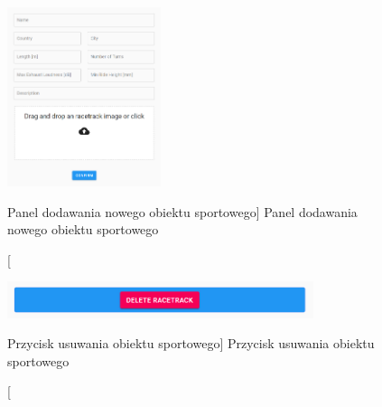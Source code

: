 \documentclass[../Kamil_Kowalewski_Main.tex]{subfiles}
\begin{document}
{{{            \begin{figure}[H]
                \centering
                \includegraphics[width=0.4\textwidth, keepaspectratio]
                {img/chapter5/admin/add_racetrack.png}
                \caption
                [Panel dodawania nowego obiektu sportowego]
                {Panel dodawania nowego obiektu sportowego}
                \label{chapter5:dok_uzytkownika:funkc_admin:dod_usun_tor:add_racetrack}
            \end{figure}

            \begin{figure}[H]
                \centering
                \includegraphics[width=0.8\textwidth, keepaspectratio]
                {img/chapter5/admin/delete_racetrack_button.png}
                \caption
                [Przycisk usuwania obiektu sportowego]
                {Przycisk usuwania obiektu sportowego}
                \label{chapter5:dok_uzytkownika:funkc_admin:dod_usun_tor:delete_racetrack}
            \end{figure}
        }
    }
}
\end{document}
